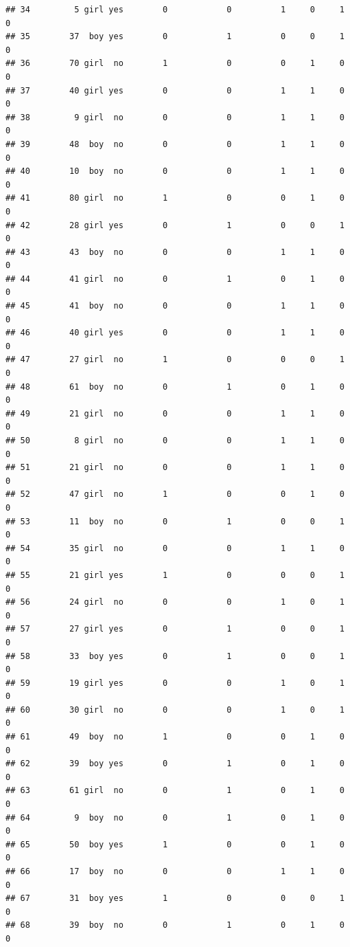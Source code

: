 \documentclass[man]{apa6}
\begin{document}
\begin{verbatim}
## 34         5 girl yes        0            0          1     0     1     0
## 35        37  boy yes        0            1          0     0     1     0
## 36        70 girl  no        1            0          0     1     0     0
## 37        40 girl yes        0            0          1     1     0     0
## 38         9 girl  no        0            0          1     1     0     0
## 39        48  boy  no        0            0          1     1     0     0
## 40        10  boy  no        0            0          1     1     0     0
## 41        80 girl  no        1            0          0     1     0     0
## 42        28 girl yes        0            1          0     0     1     0
## 43        43  boy  no        0            0          1     1     0     0
## 44        41 girl  no        0            1          0     1     0     0
## 45        41  boy  no        0            0          1     1     0     0
## 46        40 girl yes        0            0          1     1     0     0
## 47        27 girl  no        1            0          0     0     1     0
## 48        61  boy  no        0            1          0     1     0     0
## 49        21 girl  no        0            0          1     1     0     0
## 50         8 girl  no        0            0          1     1     0     0
## 51        21 girl  no        0            0          1     1     0     0
## 52        47 girl  no        1            0          0     1     0     0
## 53        11  boy  no        0            1          0     0     1     0
## 54        35 girl  no        0            0          1     1     0     0
## 55        21 girl yes        1            0          0     0     1     0
## 56        24 girl  no        0            0          1     0     1     0
## 57        27 girl yes        0            1          0     0     1     0
## 58        33  boy yes        0            1          0     0     1     0
## 59        19 girl yes        0            0          1     0     1     0
## 60        30 girl  no        0            0          1     0     1     0
## 61        49  boy  no        1            0          0     1     0     0
## 62        39  boy yes        0            1          0     1     0     0
## 63        61 girl  no        0            1          0     1     0     0
## 64         9  boy  no        0            1          0     1     0     0
## 65        50  boy yes        1            0          0     1     0     0
## 66        17  boy  no        0            0          1     1     0     0
## 67        31  boy yes        1            0          0     0     1     0
## 68        39  boy  no        0            1          0     1     0     0

\end{verbatim}
\end{document}
